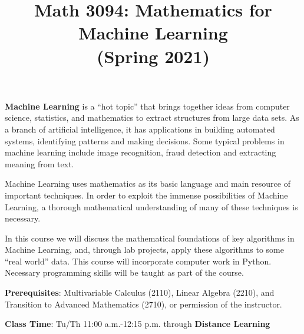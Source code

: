 \documentclass[12pt,letterpaper]{amsart}
\theoremstyle{plain}
\theoremstyle{definition}
\numberwithin{equation}{section}
\begin{document}
\title{Math 3094:  Mathematics for Machine Learning \\(Spring 2021)}

\maketitle

\thispagestyle{empty}

{\bf Machine Learning} is a ``hot topic'' that brings together ideas from computer science, statistics, and mathematics to
extract structures from large data sets. As a branch of artificial intelligence, it has applications in building automated systems, identifying patterns and making decisions. Some typical problems in machine learning include image
recognition, fraud detection and extracting meaning from text.

Machine Learning uses mathematics as its basic language and main resource of important techniques. In order to exploit the immense possibilities of Machine Learning, a thorough  mathematical understanding of many of these techniques is necessary.

In this course we will discuss the mathematical foundations of key algorithms in Machine Learning, and, through lab projects, apply these algorithms to some “real world” data. This course will incorporate computer work in Python. Necessary programming skills will be taught as part of the course.

\bigskip 

{\bf Prerequisites}:  Multivariable Calculus (2110), Linear Algebra (2210),  and Transition to Advanced Mathematics (2710), or permission of the instructor.

\bigskip

{\bf Class Time}: Tu/Th 11:00 a.m.-12:15 p.m. through {\bf Distance Learning}

\bigskip
\end{document}
